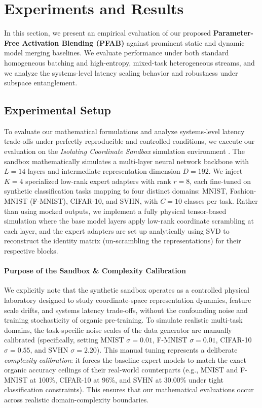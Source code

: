 \section{Experiments and Results}
\label{sec:experiments}

In this section, we present an empirical evaluation of our proposed \textbf{Parameter-Free Activation Blending (PFAB)} against prominent static and dynamic model merging baselines. We evaluate performance under both standard homogeneous batching and high-entropy, mixed-task heterogeneous streams, and we analyze the systems-level latency scaling behavior and robustness under subspace entanglement.

\subsection{Experimental Setup}
To evaluate our mathematical formulations and analyze systems-level latency trade-offs under perfectly reproducible and controlled conditions, we execute our evaluation on the \emph{Isolating Coordinate Sandbox} simulation environment \cite{subspace2026}. The sandbox mathematically simulates a multi-layer neural network backbone with $L=14$ layers and intermediate representation dimension $D=192$. We inject $K=4$ specialized low-rank expert adapters with rank $r=8$, each fine-tuned on synthetic classification tasks mapping to four distinct domains: MNIST, Fashion-MNIST (F-MNIST), CIFAR-10, and SVHN, with $C=10$ classes per task. Rather than using mocked outputs, we implement a fully physical tensor-based simulation where the base model layers apply low-rank coordinate scrambling at each layer, and the expert adapters are set up analytically using SVD to reconstruct the identity matrix (un-scrambling the representations) for their respective blocks.

\paragraph{Purpose of the Sandbox \& Complexity Calibration}
We explicitly note that the synthetic sandbox operates as a controlled physical laboratory designed to study coordinate-space representation dynamics, feature scale drifts, and systems latency trade-offs, without the confounding noise and training stochasticity of organic pre-training. To simulate realistic multi-task domains, the task-specific noise scales of the data generator are manually calibrated (specifically, setting MNIST $\sigma=0.01$, F-MNIST $\sigma=0.01$, CIFAR-10 $\sigma=0.55$, and SVHN $\sigma=2.20$). This manual tuning represents a deliberate \emph{complexity calibration}: it forces the baseline expert models to match the exact organic accuracy ceilings of their real-world counterparts (e.g., MNIST and F-MNIST at 100\%, CIFAR-10 at 96\%, and SVHN at 30.00\% under tight classification constraints). This ensures that our mathematical evaluations occur across realistic domain-complexity boundaries.

